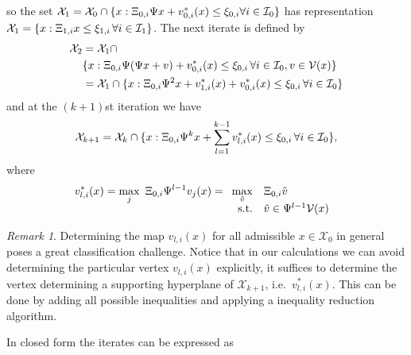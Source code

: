\documentclass[journal]{IEEEtran}
\newcounter{thmcount}
\theoremstyle{remark}
\newtheorem{rem}[thmcount]{Remark}
\theoremstyle{definition}
\begin{document}
so the set $\mathcal X_1=\mathcal X_0 \cap \{x:\Xi_{0,i}\Psi x + v_{0,i}^\ast(x) \leq 
\xi_{0,i}\forall i\in\mathcal I_0\}$
has representation $\mathcal X_1 = \{x:\Xi_{1,i}x\leq\xi_{1,i}\,\forall i\in\mathcal I_1\}$.
The next iterate is defined by
\begin{align*}
  \mathcal X_2 &= \mathcal X_1 \cap \\ &\{x:\Xi_{0,i}\Psi(\Psi x + v) + v_{0,i}^\ast(x)\leq\xi_{0,i}\,
  \forall i\in\mathcal I_0,v\in\mathcal V(x)\}\\
  &= \mathcal X_1 \cap \{x: \Xi_{0,i}\Psi^2 x + v_{1,i}^\ast(x) + v_{0,i}^\ast(x)\leq\xi_{0,i}\,\forall 
  i\in\mathcal I_0\}
\end{align*}
%
and at the $(k+1)$st iteration we have
%
\[
  \mathcal X_{k+1} = \mathcal X_k\cap \{x:\Xi_{0,i}\Psi^k x + \sum_{l=1}^{k-1}v_{l,i}^\ast(x)
  \leq\xi_{0,i}\,\forall i\in\mathcal I_0\},
\]
%
where 
%
\[
  v_{l,i}^\ast(x)=\max_j \ \genmat_{0,i}\Psi^{l-1}v_j(x)
   = \begin{array}[t]{rl} \displaystyle\max_{\tilde v} & \genmat_{0,i}\tilde v\\ \text{s.t.}& \tilde v\in 
   \Psi^{l-1}\mathcal V(x) \end{array}
\]
%
\begin{rem}
Determining the map $v_{l,i}(x)$ for all admissible $x\in \mathcal X_0$ in general poses a great classification
challenge. 
%
Notice that in our calculations we can avoid determining the particular vertex $v_{l,i}(x)$ explicitly, it
suffices to determine the vertex determining a supporting hyperplane of $\mathcal X_{k+1}$, i.e.~$v_{l,i}^\ast(x)$. 
%
This can be done by adding all possible inequalities and applying a inequality reduction algorithm.
\end{rem}
%
In closed form the iterates can be expressed as
\end{document}
